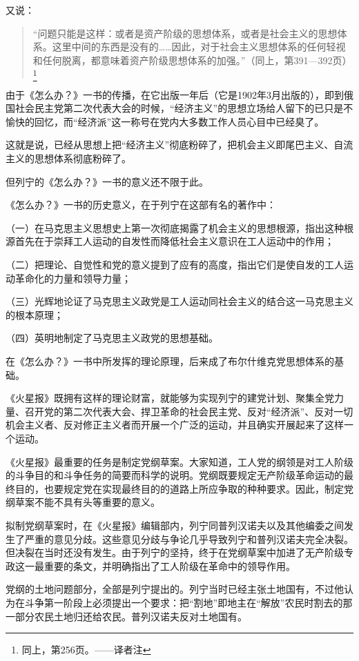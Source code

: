 又说：

\begin{quotation}
“问题只能是这样：或者是资产阶级的思想体系，或者是社会主义的思想体系。这里中间的东西是没有的……因此，对于社会主义思想体系的任何轻视和任何脱离，都意味着资产阶级思想体系的加强。”（同上，第391—392页）\footnote{同上，第256页。——译者注}
\end{quotation}

由于《怎么办？》一书的传播，在它出版一年后（它是1902年3月出版的），即到俄国社会民主党第二次代表大会的时候，“经济主义”的思想立场给人留下的已只是不愉快的回忆，而“经济派”这一称号在党内大多数工作人员心目中已经臭了。

这就是说，已经从思想上把“经济主义”彻底粉碎了，把机会主义即尾巴主义、自流主义的思想体系彻底粉碎了。

但列宁的《怎么办？》一书的意义还不限于此。

《怎么办？》一书的历史意义，在于列宁在这部有名的著作中：

（一）在马克思主义思想史上第一次彻底揭露了机会主义的思想根源，指出这种根源首先在于崇拜工人运动的自发性而降低社会主义意识在工人运动中的作用；

（二）把理论、自觉性和党的意义提到了应有的高度，指出它们是使自发的工人运动革命化的力量和领导力量；

（三）光辉地论证了马克思主义政党是工人运动同社会主义的结合这一马克思主义的根本原理；

（四）英明地制定了马克思主义政党的思想基础。

在《怎么办？》一书中所发挥的理论原理，后来成了布尔什维克党思想体系的基础。

《火星报》既拥有这样的理论财富，就能够为实现列宁的建党计划、聚集全党力量、召开党的第二次代表大会、捍卫革命的社会民主党、反对“经济派”、反对一切机会主义者、反对修正主义者而开展一个广泛的运动，并且确实开展起来了这样一个运动。

《火星报》最重要的任务是制定党纲草案。大家知道，工人党的纲领是对工人阶级的斗争目的和斗争任务的简要而科学的说明。党纲既要规定无产阶级革命运动的最终目的，也要规定党在实现最终目的的道路上所应争取的种种要求。因此，制定党纲草案不能不具有头等重要的意义。

拟制党纲草案时，在《火星报》编辑部内，列宁同普列汉诺夫以及其他编委之间发生了严重的意见分歧。这些意见分歧与争论几乎导致列宁和普列汉诺夫完全决裂。但决裂在当时还没有发生。由于列宁的坚持，终于在党纲草案中加进了无产阶级专政这一最重要的条文，并明确指出了工人阶级在革命中的领导作用。

党纲的土地问题部分，全部是列宁提出的。列宁当时已经主张土地国有，不过他认为在斗争第一阶段上必须提出一个要求：把“割地”即地主在“解放”农民时割去的那一部分农民土地归还给农民。普列汉诺夫反对土地国有。


